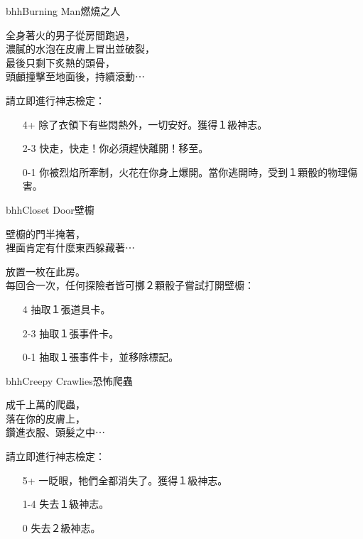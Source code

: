 \begin{EventCard}{bhh}{Burning Man}{燃燒之人}
  \begin{CardStory}
    全身著火的男子從房間跑過，\\
    濃膩的水泡在皮膚上冒出並破裂，\\
    最後只剩下炙熱的頭骨，\\
    頭顱撞擊至地面後，持續滾動⋯
  \end{CardStory}
  請立即進行神志檢定：
  \begin{itemize}
    \item[4+] 除了衣領下有些悶熱外，一切安好。獲得１級神志。
    \item[2-3] 快走，快走！你必須趕快離開！移至。
    \item[0-1] 你被烈焰所牽制，火花在你身上爆開。當你逃開時，受到１顆骰的物理傷害。
  \end{itemize}
\end{EventCard}%
\linebreak[0]%
\begin{EventCard}{bhh}{Closet Door}{壁櫥}
  \begin{CardStory}
    壁櫥的門半掩著，\\
    裡面肯定有什麼東西躲藏著⋯
  \end{CardStory}
  放置一枚在此房。\\[0.5em]
  每回合一次，任何探險者皆可擲２顆骰子嘗試打開壁櫥：
  \begin{itemize}
    \item[4] 抽取１張道具卡。
    \item[2-3] 抽取１張事件卡。
    \item[0-1] 抽取１張事件卡，並移除標記。
  \end{itemize}
\end{EventCard}%
\linebreak[0]%
\begin{EventCard}{bhh}{Creepy Crawlies}{恐怖爬蟲}
  \begin{CardStory}
    成千上萬的爬蟲，\\
    落在你的皮膚上，\\
    鑽進衣服、頭髮之中⋯
  \end{CardStory}
  請立即進行神志檢定：
  \begin{itemize}
    \item[5+] 一眨眼，牠們全都消失了。獲得１級神志。
    \item[1-4] 失去１級神志。
    \item[0] 失去２級神志。
  \end{itemize}
\end{EventCard}%
